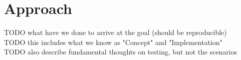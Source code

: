 \chapter{Approach}
TODO what have we done to arrive at the goal (should be reproducible)\\
TODO this includes what we know as "Concept" and "Implementation"\\
TODO also describe fundamental thoughts on testing, but not the scenarios\\
